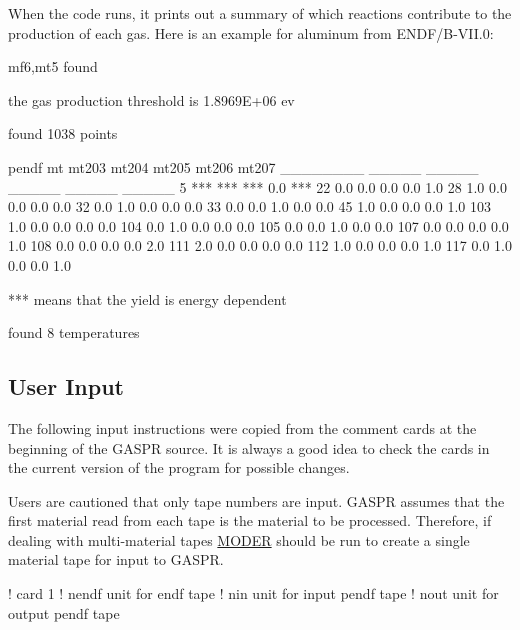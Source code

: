 When the code runs, it prints out a summary of which reactions
contribute to the production of each gas.  Here is an example for
aluminum from ENDF/B-VII.0:

\newpage
\small
\begin{ccode}

 mf6,mt5 found

 the gas production threshold is  1.8969E+06 ev

 found  1038 points

 pendf mt  mt203  mt204  mt205  mt206  mt207
 ________  _____  _____  _____  _____  _____
       5    ***    ***    ***    0.0    ***
      22    0.0    0.0    0.0    0.0    1.0
      28    1.0    0.0    0.0    0.0    0.0
      32    0.0    1.0    0.0    0.0    0.0
      33    0.0    0.0    1.0    0.0    0.0
      45    1.0    0.0    0.0    0.0    1.0
     103    1.0    0.0    0.0    0.0    0.0
     104    0.0    1.0    0.0    0.0    0.0
     105    0.0    0.0    1.0    0.0    0.0
     107    0.0    0.0    0.0    0.0    1.0
     108    0.0    0.0    0.0    0.0    2.0
     111    2.0    0.0    0.0    0.0    0.0
     112    1.0    0.0    0.0    0.0    1.0
     117    0.0    1.0    0.0    0.0    1.0

 *** means that the yield is energy dependent

 found 8 temperatures

\end{ccode}
\normalsize

\subsection{User Input}
\label{ssGASPR_inp}

The following input instructions were copied from the comment cards
at the beginning of the GASPR source.  It is always a good idea to
check the cards in the current version of the program for possible
changes.

Users are cautioned that only tape numbers are input.  GASPR assumes that
the first material read from each tape is the material to be processed.
Therefore, if dealing with multi-material tapes \hyperlink{sMODERhy}{MODER}
should be run to create a single material tape for input to GASPR.

\newpage
\small
\begin{ccode}

   ! card 1
   !    nendf    unit for endf tape
   !    nin      unit for input pendf tape
   !    nout     unit for output pendf tape

\end{ccode}
\normalsize

